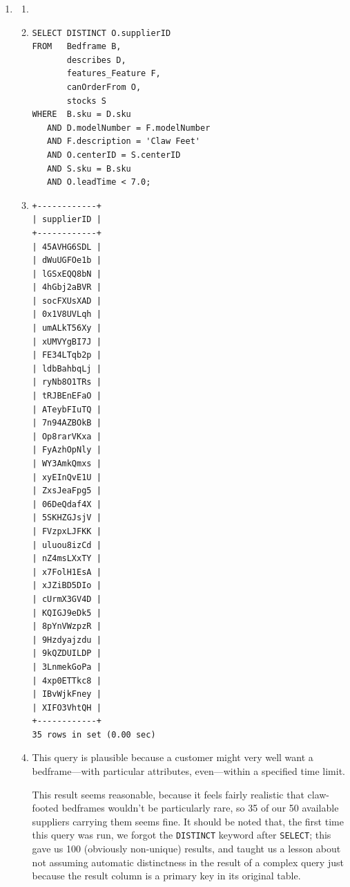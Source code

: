 \documentclass[american,extrafontsizes,12pt,portrait,letterpaper,oneside,onecolumn,final]{memoir}
\newcommand*{\mysqli}[1]{\texttt{#1}}
\begin{document}
\begin{enumerate}[leftmargin=*,label={\strong{\uline{(\emph{\Alph*})}}}]
\item
\begin{enumerate}[leftmargin=*,widest={\strong{Explanation:}}]
\item[\strong{Intent:}] 
\item[\strong{Query:}]
\begin{verbatim}
SELECT DISTINCT O.supplierID
FROM   Bedframe B,
       describes D,
       features_Feature F,
       canOrderFrom O,
       stocks S
WHERE  B.sku = D.sku
   AND D.modelNumber = F.modelNumber
   AND F.description = 'Claw Feet'
   AND O.centerID = S.centerID
   AND S.sku = B.sku
   AND O.leadTime < 7.0;
\end{verbatim}
\item[\strong{Result:}]
\begin{verbatim}
+------------+
| supplierID |
+------------+
| 45AVHG6SDL |
| dWuUGFOe1b |
| lGSxEQQ8bN |
| 4hGbj2aBVR |
| socFXUsXAD |
| 0x1V8UVLqh |
| umALkT56Xy |
| xUMVYgBI7J |
| FE34LTqb2p |
| ldbBahbqLj |
| ryNb8O1TRs |
| tRJBEnEFaO |
| ATeybFIuTQ |
| 7n94AZBOkB |
| Op8rarVKxa |
| FyAzhOpNly |
| WY3AmkQmxs |
| xyEInQvE1U |
| ZxsJeaFpg5 |
| 06DeQdaf4X |
| 5SKHZGJsjV |
| FVzpxLJFKK |
| uluou8izCd |
| nZ4msLXxTY |
| x7FolH1EsA |
| xJZiBD5DIo |
| cUrmX3GV4D |
| KQIGJ9eDk5 |
| 8pYnVWzpzR |
| 9Hzdyajzdu |
| 9kQZDUILDP |
| 3LnmekGoPa |
| 4xp0ETTkc8 |
| IBvWjkFney |
| XIFO3VhtQH |
+------------+
35 rows in set (0.00 sec)
\end{verbatim}
\item[\strong{Explanation:}] This query is plausible because a customer might very well want a bedframe---with particular attributes, even---within a specified time limit.

This result seems reasonable, because it feels fairly realistic that claw\hyp footed bedframes wouldn't be particularly rare, so 35 of our 50 available suppliers carrying them seems fine.
It should be noted that, the first time this query was run, we forgot the \mysqli{DISTINCT} keyword after \mysqli{SELECT}; this gave us 100 (obviously non\hyp unique) results, and taught us a lesson about not assuming automatic distinctness in the result of a complex query just because the result column is a primary key in its original table.
\end{enumerate}


\end{enumerate}
\end{document}
